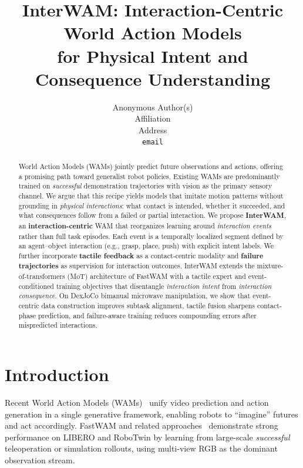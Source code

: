 \documentclass{article}
\begin{document}
\title{InterWAM: Interaction-Centric World Action Models\\for Physical Intent and Consequence Understanding}

\author{Anonymous Author(s) \\
Affiliation \\
Address \\
\texttt{email} \\
}

\maketitle

\begin{abstract}
World Action Models (WAMs) jointly predict future observations and actions, offering a promising path toward generalist robot policies.
Existing WAMs are predominantly trained on \emph{successful} demonstration trajectories with vision as the primary sensory channel.
We argue that this recipe yields models that imitate motion patterns without grounding in \emph{physical interactions}: what contact is intended, whether it succeeded, and what consequences follow from a failed or partial interaction.
We propose \textbf{InterWAM}, an \textbf{interaction-centric} WAM that reorganizes learning around \emph{interaction events} rather than full task episodes.
Each event is a temporally localized segment defined by an agent--object interaction (e.g., grasp, place, push) with explicit intent labels.
We further incorporate \textbf{tactile feedback} as a contact-centric modality and \textbf{failure trajectories} as supervision for interaction outcomes.
InterWAM extends the mixture-of-transformers (MoT) architecture of FastWAM with a tactile expert and event-conditioned training objectives that disentangle \emph{interaction intent} from \emph{interaction consequence}.
On DexJoCo bimanual microwave manipulation, we show that event-centric data construction improves subtask alignment, tactile fusion sharpens contact-phase prediction, and failure-aware training reduces compounding errors after mispredicted interactions.
\end{abstract}

\section{Introduction}
\label{sec:intro}

Recent World Action Models (WAMs)~\citep{fastwam2026} unify video prediction and action generation in a single generative framework, enabling robots to ``imagine'' futures and act accordingly.
FastWAM and related approaches~\citep{cosmos2025,genie2024} demonstrate strong performance on LIBERO and RoboTwin by learning from large-scale \emph{successful} teleoperation or simulation rollouts, using multi-view RGB as the dominant observation stream.
\end{document}
